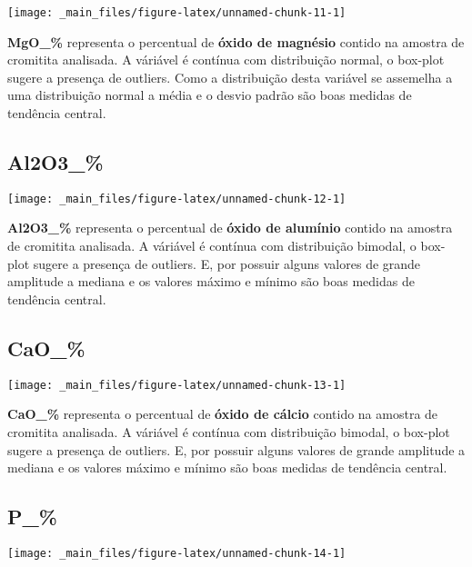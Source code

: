 \documentclass[
]{article}
\begin{document}
\begin{center}\texttt{[image: \_main\_files/figure-latex/unnamed-chunk-11-1]} \end{center}

\textbf{MgO\_\%} representa o percentual de \textbf{óxido de magnésio} contido na amostra de cromitita analisada. A váriável é contínua com distribuição normal, o box-plot sugere a presença de outliers. Como a distribuição desta variável se assemelha a uma distribuição normal a média e o desvio padrão são boas medidas de tendência central.

\hypertarget{al2o3_}{%
\subsection{Al2O3\_\%}\label{al2o3_}}

\begin{center}\texttt{[image: \_main\_files/figure-latex/unnamed-chunk-12-1]} \end{center}

\textbf{Al2O3\_\%} representa o percentual de \textbf{óxido de alumínio} contido na amostra de cromitita analisada. A váriável é contínua com distribuição bimodal, o box-plot sugere a presença de outliers. E, por possuir alguns valores de grande amplitude a mediana e os valores máximo e mínimo são boas medidas de tendência central.

\hypertarget{cao_}{%
\subsection{CaO\_\%}\label{cao_}}

\begin{center}\texttt{[image: \_main\_files/figure-latex/unnamed-chunk-13-1]} \end{center}

\textbf{CaO\_\%} representa o percentual de \textbf{óxido de cálcio} contido na amostra de cromitita analisada. A váriável é contínua com distribuição bimodal, o box-plot sugere a presença de outliers. E, por possuir alguns valores de grande amplitude a mediana e os valores máximo e mínimo são boas medidas de tendência central.

\hypertarget{p_}{%
\subsection{P\_\%}\label{p_}}

\begin{center}\texttt{[image: \_main\_files/figure-latex/unnamed-chunk-14-1]} \end{center}
\end{document}

